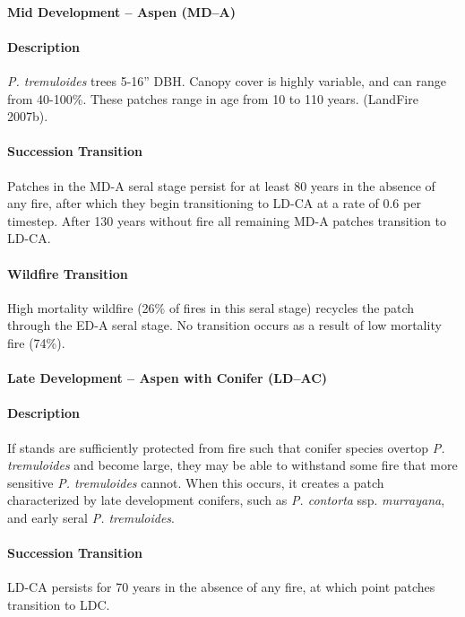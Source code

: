 \paragraph{Mid Development – Aspen (MD–A)}

\paragraph{Description} \emph{P. tremuloides} trees 5-16'' DBH. Canopy cover is highly variable, and can range from 40-100\%. These patches range in age from 10 to 110 years. (LandFire 2007b).

\paragraph{Succession Transition} Patches in the MD-A seral stage persist for at least 80 years in the absence of any fire, after which they begin transitioning to LD-CA at a rate of 0.6 per timestep. After 130 years without fire all remaining MD-A patches transition to LD-CA. 

\paragraph{Wildfire Transition} High mortality wildfire (26\% of fires in this seral stage) recycles the patch through the ED-A seral stage. No transition occurs as a result of low mortality fire (74\%).

\noindent\hrulefill


\paragraph{Late Development – Aspen with Conifer (LD–AC)}

\paragraph{Description} If stands are sufficiently protected from fire such that conifer species overtop \emph{P. tremuloides} and become large, they may be able to withstand some fire that more sensitive \emph{P. tremuloides} cannot. When this occurs, it creates a patch characterized by late development conifers, such as \emph{P. contorta} ssp. \emph{murrayana}, and early seral \emph{P. tremuloides}. 

\paragraph{Succession Transition} LD-CA persists for 70 years in the absence of any fire, at which point patches transition to LDC. 

